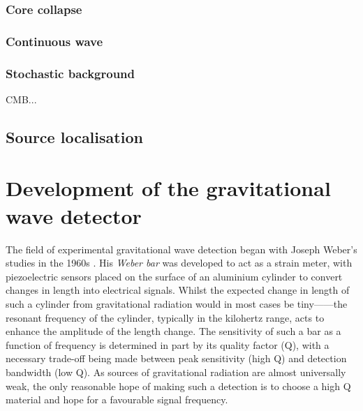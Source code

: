 
\subsubsection{Core collapse}

\subsubsection{Continuous wave}

\subsubsection{Stochastic background}
CMB...


\subsection{Source localisation}

\section{Development of the gravitational wave detector}
The field of experimental gravitational wave detection began with Joseph Weber's studies in the 1960s \cite{Weber1960}. His \emph{Weber bar} was developed to act as a strain meter, with piezoelectric sensors placed on the surface of an aluminium cylinder to convert changes in length into electrical signals. Whilst the expected change in length of such a cylinder from gravitational radiation would in most cases be tiny------the resonant frequency of the cylinder, typically in the kilohertz range, acts to enhance the amplitude of the length change. The sensitivity of such a bar as a function of frequency is determined in part by its quality factor (Q), with a necessary trade-off being made between peak sensitivity (high Q) and detection bandwidth (low Q). As sources of gravitational radiation are almost universally weak, the only reasonable hope of making such a detection is to choose a high Q material and hope for a favourable signal frequency.


